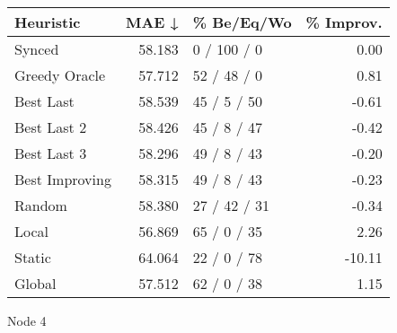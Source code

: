 \begin{tabular}{lrlr}
\toprule
\textbf{Heuristic} & \textbf{MAE ↓} & \textbf{\% Be/Eq/Wo} & \textbf{\% Improv.} \\
\midrule
            Synced &         58.183 &          0 / 100 / 0 &                0.00 \\
     Greedy Oracle &         57.712 &          52 / 48 / 0 &                0.81 \\
         Best Last &         58.539 &          45 / 5 / 50 &               -0.61 \\
       Best Last 2 &         58.426 &          45 / 8 / 47 &               -0.42 \\
       Best Last 3 &         58.296 &          49 / 8 / 43 &               -0.20 \\
    Best Improving &         58.315 &          49 / 8 / 43 &               -0.23 \\
            Random &         58.380 &         27 / 42 / 31 &               -0.34 \\
             Local &         56.869 &          65 / 0 / 35 &                2.26 \\
            Static &         64.064 &          22 / 0 / 78 &              -10.11 \\
            Global &         57.512 &          62 / 0 / 38 &                1.15 \\
\bottomrule
\end{tabular}
\caption{Node 4}
\label{tab:iid_lr05_le1_bs4_4}

